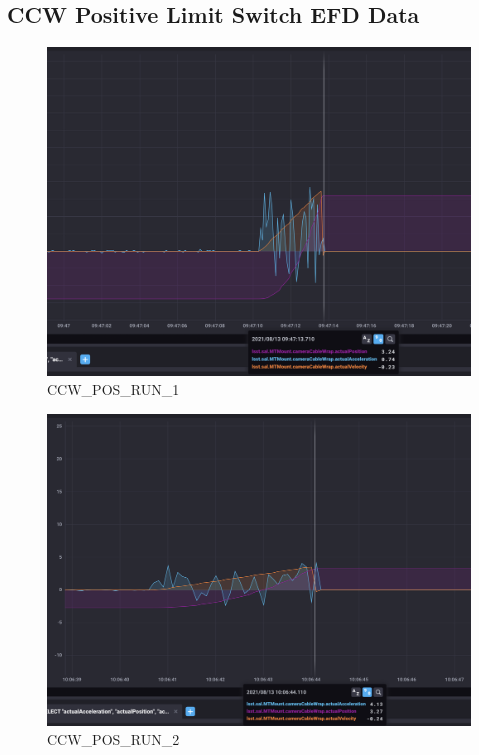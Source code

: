 \documentclass[SE,authoryear,toc, lsstdraft]{lsstdoc}
\begin{document}
\subsection{CCW Positive Limit Switch EFD Data}
\begin{figure}
  \includegraphics[width=\linewidth]{media/ccw_pos_1.png}
  \caption{CCW\_POS\_RUN\_1}
  \label{fig:CCW_POS_RUN_1}
\end{figure}
\newpage
\begin{figure}
  \includegraphics[width=\linewidth]{media/ccw_pos_2.png}
  \caption{CCW\_POS\_RUN\_2}
  \label{fig:CCW_POS_RUN_2}
\end{figure}
\newpage
\end{document}
